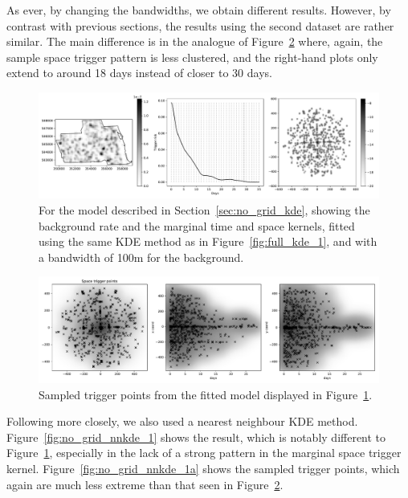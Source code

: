 \documentclass[twoside,a4paper]{article}
\theoremstyle{plain}
\theoremstyle{definition}
\begin{document}
As ever, by changing the bandwidths, we obtain different results.  However, by contrast
with previous sections, the results using the second dataset are rather similar. The main
difference is in the analogue of Figure~\ref{fig:no_grid_kde_1a} where, again, the sample
space trigger pattern is less clustered, and the right-hand plots only extend to around 18 days
instead of closer to 30 days.

\begin{figure}
  \includegraphics[width=\textwidth]{../notebooks/no_grid_kde_1.pdf}
  \caption{For the model described in Section~\ref{sec:no_grid_kde}, showing the background
rate and the marginal time and space kernels, fitted using the same KDE method as in
Figure~\ref{fig:full_kde_1}, and with a bandwidth of 100m for the background.}
  \label{fig:no_grid_kde_1}
\end{figure}

\begin{figure}
  \includegraphics[width=\textwidth]{../notebooks/no_grid_kde_1a.pdf}
  \caption{Sampled trigger points from the fitted model displayed in
Figure~\ref{fig:no_grid_kde_1}.}
  \label{fig:no_grid_kde_1a}
\end{figure}

Following \cite{sepp2} more closely, we also used a nearest neighbour KDE method.
Figure~\ref{fig:no_grid_nnkde_1} shows the result, which is notably different to
Figure~\ref{fig:no_grid_kde_1}, especially in the lack of a strong pattern in the
marginal space trigger kernel.  Figure~\ref{fig:no_grid_nnkde_1a} shows the sampled
trigger points, which again are much less extreme than that seen in
Figure~\ref{fig:no_grid_kde_1a}.
\end{document}
